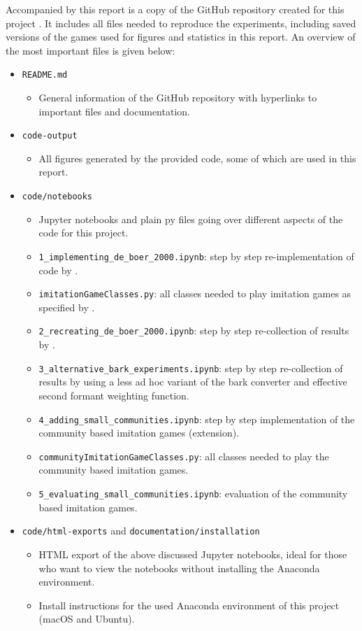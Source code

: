Accompanied by this report is a copy of the GitHub repository created for this project \citep{github_project}.
It includes all files needed to reproduce the experiments, including saved versions of the games used for figures and statistics in this report.
An overview of the most important files is given below:
\begin{itemize}
    \item \texttt{README.md}
    \begin{itemize}
        \item General information of the GitHub repository with hyperlinks to important files and documentation. 
    \end{itemize}
    \item \texttt{code-output}
    \begin{itemize}
        \item All figures generated by the provided code, some of which are used in this report.
    \end{itemize}
    \item \texttt{code/notebooks}
    \begin{itemize}
        \item Jupyter notebooks and plain py files going over different aspects of the code for this project.
        \item \texttt{1\_implementing\_de\_boer\_2000.ipynb}: step by step re-implementation of code by \citet{deBoer2000}.
        \item \texttt{imitationGameClasses.py}: all classes needed to play imitation games as specified by \citet{deBoer2000}.
        \item \texttt{2\_recreating\_de\_boer\_2000.ipynb}: step by step re-collection of results by \citet{deBoer2000}.
        \item \texttt{3\_alternative\_bark\_experiments.ipynb}: step by step re-collection of results by \citet{deBoer2000} using a less ad hoc variant of the bark converter and effective second formant weighting function.
        \item \texttt{4\_adding\_small\_communities.ipynb}: step by step implementation of the community based imitation games (extension).
        \item \texttt{communityImitationGameClasses.py}: all classes needed to play the community based imitation games.
        \item \texttt{5\_evaluating\_small\_communities.ipynb}: evaluation of the community based imitation games.
    \end{itemize}
    \item \texttt{code/html-exports} and \texttt{documentation/installation}
    \begin{itemize}
        \item HTML export of the above discussed Jupyter notebooks, ideal for those who want to view the notebooks without installing the Anaconda environment.
        \item Install instructions for the used Anaconda environment of this project (macOS and Ubuntu).
    \end{itemize}
\end{itemize}